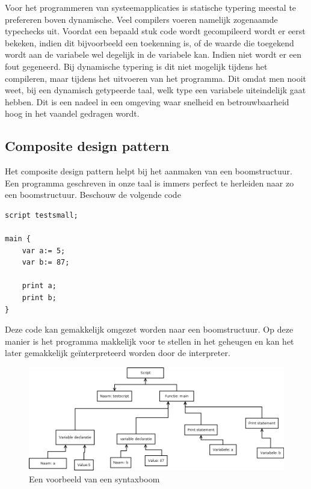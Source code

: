 \documentclass[11pt,a4paper]{article}
\begin{document}
Voor het programmeren van systeemapplicaties is statische typering meestal te prefereren boven dynamische. Veel compilers voeren namelijk zogenaamde typechecks uit. Voordat een bepaald stuk code wordt gecompileerd wordt er eerst bekeken, indien dit bijvoorbeeld een toekenning is, of de waarde die toegekend wordt aan de variabele wel degelijk in de variabele kan. Indien niet wordt er een fout gegeneerd. Bij dynamische typering is dit niet mogelijk tijdens het compileren, maar tijdens het uitvoeren van het programma. Dit omdat men nooit weet, bij een dynamisch getypeerde taal, welk type een variabele uiteindelijk gaat hebben. Dit is een nadeel in een omgeving waar snelheid en betrouwbaarheid hoog in het vaandel gedragen wordt. 

\subsection{Composite design pattern}
Het composite design pattern helpt bij het aanmaken van een boomstructuur. Een programma geschreven in onze taal is immers perfect te herleiden naar zo een boomstructuur. Beschouw de volgende code

\begin{verbatim}
script testsmall;

main {
	var a:= 5;
	var b:= 87;
	
	print a;
	print b;
}

\end{verbatim}
Deze code kan gemakkelijk omgezet worden naar een boomstructuur. Op deze manier is het programma makkelijk voor te stellen in het geheugen en kan het later gemakkelijk geïnterpreteerd worden door de interpreter.
\begin{figure}[ht]
\centering
\includegraphics[width=\textwidth]{afbeeldingen/testsmall_tree}
\caption{Een voorbeeld van een syntaxboom}
\end{figure}
\end{document}
